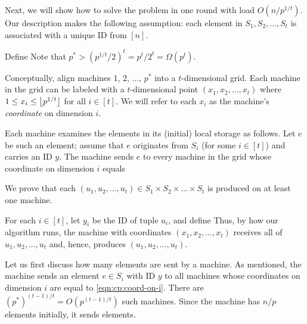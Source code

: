 \vgap

Next, we will show how to solve the problem in one round with load $O(n / p^{1/t})$. Our description makes the following assumption: each element in $S_1, S_2, ..., S_t$ is associated with a unique ID from $[n]$.

 Define
Note that $p^* > (p^{1/t} / 2)^t = p^t / 2^t = \Omega(p^t)$.

\vgap

Conceptually, align machines 1, 2, ..., $p^*$ into a $t$-dimensional
grid. Each machine in the grid can be labeled with a $t$-dimensional point $(x_1, x_2, ..., x_t)$ where $1 \le x_i \le \left \lfloor p^{1/t} \right \rfloor$ for all $i \in [t]$. We will refer to each $x_i$  as the machine's {\em coordinate} on dimension $i$.

\vgap

Each machine examines the elements in its (initial) local storage as follows. Let $e$ be such an element; assume that $e$ originates from $S_i$ (for some $i \in [t]$) and carries an ID $y$. The machine sends $e$ to every machine in the grid whose coordinate on dimension $i$ equals

 We prove that each $(u_1, u_2, ..., u_t) \in S_1 \times S_2 \times ... \times S_t$ is produced on at least one machine.

\vgap

For each $i \in [t]$, let $y_i$ be the ID of tuple $u_i$, and define
Thus, by how our algorithm runs, the machine with coordinates $(x_1, x_2, ..., x_t)$ receives all of $u_1, u_2, ..., u_t$ and, hence, produces $(u_1, u_2, ..., u_t)$.

 Let us first discuss how many elements are sent by a machine. As mentioned, the machine sends an element $e \in S_i$ with ID $y$ to all machines whose coordinates on dimension $i$ are equal to \eqref{eqn:cp:coord-on-i}. There are $(p^*)^{(t-1)/t} = O(p^{(t-1)/t})$ such machines. Since the machine has $n/p$ elements initially, it sends
elements.

\vgap

